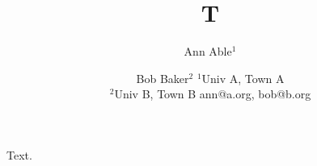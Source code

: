 \documentclass{article}
\begin{document}
\title{T}
\author{Ann Able$^{1}$ \and Bob Baker$^{2}$
\affiliations
$^{1}$Univ A, Town A\\
$^{2}$Univ B, Town B
\emails
ann@a.org, bob@b.org}
\maketitle
Text.
\end{document}
